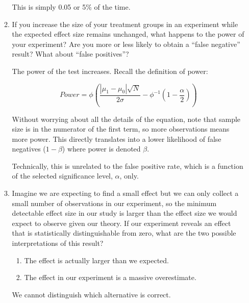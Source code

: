 \documentclass[a4paper]{exam}
\begin{document}
\begin{enumerate}
\begin{enumerate}
\begin{solution}
	This is simply 0.05 or 5\% of the time.
	
	\end{solution}
	
	\item If you increase the size of your treatment groups in an experiment while the expected effect size remains unchanged, what happens to the power of your experiment? Are you more or less likely to obtain a ``false negative'' result? What about ``false positives''?
	
	\begin{solution}
	
	The power of the test increases. Recall the definition of power:
	
	\begin{equation}
	Power = \phi\left( \frac{|\mu_1 - \mu_0|\sqrt{N}}{2\sigma} - \phi^{-1}\left( 1 - \frac{\alpha}{2} \right) \right)
	\end{equation}
	
	Without worrying about all the details of the equation, note that sample size is in the numerator of the first term, so more observations means more power. This directly translates into a lower likelihood of false negatives ($1-\beta$) where power is denoted $\beta$.
	
	Technically, this is unrelated to the false positive rate, which is a function of the selected significance level, $\alpha$, only.
	
	\end{solution}
	
	\item Imagine we are expecting to find a small effect but we can only collect a small number of observations in our experiment, so the minimum detectable effect size in our study is larger than the effect size we would expect to observe given our theory. If our experiment reveals an effect that is statistically distinguishable from zero, what are the two possible interpretations of this result?
	
	\begin{solution}
	
	\begin{enumerate}
	\item The effect is actually larger than we expected.
	\item The effect in our experiment is a massive overestimate.
	\end{enumerate}
	
	We cannot distinguish which alternative is correct.
	

\end{solution}
\end{enumerate}
\end{enumerate}
\end{document}
